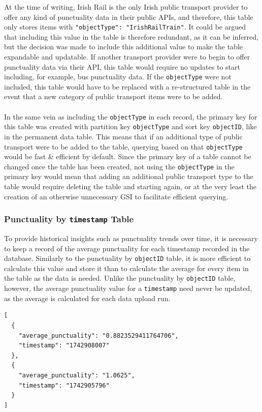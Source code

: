 \documentclass[a4paper,11pt]{report}
\newenvironment{code}{\captionsetup{type=listing}}{}
\begin{document}
At the time of writing, Irish Rail is the only Irish public transport provider to offer any kind of punctuality data in their public APIs, and therefore, this table only stores items with \texttt{"objectType": "IrishRailTrain"}.
It could be argued that including this value in the table is therefore redundant, as it can be inferred, but the decision was made to include this additional value to make the table expandable and updatable.
If another transport provider were to begin to offer punctuality data via their API, this table would require no updates to start including, for example, bus punctuality data.
If the \verb|objectType| were not included, this table would have to be replaced with a re-structured table in the event that a new category of public transport items were to be added.
\\\\
In the same vein as including the \verb|objectType| in each record, the primary key for this table was created with partition key \verb|objectType| and sort key \verb|objectID|, like in the permanent data table.
This means that if an additional type of public transport were to be added to the table, querying based on that \verb|objectType| would be fast \& efficient by default.
Since the primary key of a table cannot be changed once the table has been created, not using the \verb|objectType| in the primary key would mean that adding an additional public transport type to the table would require deleting the table and starting again, or at the very least the creation of an otherwise unnecessary GSI to facilitate efficient querying.

\subsubsection{Punctuality by \texttt{timestamp} Table}
To provide historical insights such as punctuality trends over time, it is necessary to keep a record of the average punctuality for each timestamp recorded in the database.
Similarly to the punctuality by \verb|objectID| table, it is more efficient to calculate this value and store it than to calculate the average for every item in the table as the data is needed.
Unlike the punctuality by \verb|objectID| table, however, the average punctuality value for a \verb|timestamp| need never be updated, as the average is calculated for each data upload run.

\begin{code}
\begin{verbatim}
[
  {
    "average_punctuality": "0.8823529411764706",
    "timestamp": "1742908007"
  },
  {
    "average_punctuality": "1.0625",
    "timestamp": "1742905796"
  }
]
\end{verbatim}
\caption{Sample of items from the average punctuality by \texttt{timestamp} table}
\end{code}
\end{document}

